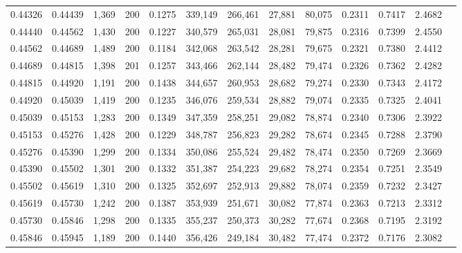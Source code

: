 \begin{tabular}{rrrrrrrrrrrrr}
0.44326 & 0.44439 & 1,369 & 200 &                                     0.1275 & 339,149 & 266,461 &  27,881 &  80,075 & 0.2311 & 0.7417 & 2.4682 \\
0.44440 & 0.44562 & 1,430 & 200 &                                     0.1227 & 340,579 & 265,031 &  28,081 &  79,875 & 0.2316 & 0.7399 & 2.4550 \\
0.44562 & 0.44689 & 1,489 & 200 &                                     0.1184 & 342,068 & 263,542 &  28,281 &  79,675 & 0.2321 & 0.7380 & 2.4412 \\
0.44689 & 0.44815 & 1,398 & 201 &                                     0.1257 & 343,466 & 262,144 &  28,482 &  79,474 & 0.2326 & 0.7362 & 2.4282 \\
0.44815 & 0.44920 & 1,191 & 200 &                                     0.1438 & 344,657 & 260,953 &  28,682 &  79,274 & 0.2330 & 0.7343 & 2.4172 \\
0.44920 & 0.45039 & 1,419 & 200 &                                     0.1235 & 346,076 & 259,534 &  28,882 &  79,074 & 0.2335 & 0.7325 & 2.4041 \\
0.45039 & 0.45153 & 1,283 & 200 &                                     0.1349 & 347,359 & 258,251 &  29,082 &  78,874 & 0.2340 & 0.7306 & 2.3922 \\
0.45153 & 0.45276 & 1,428 & 200 &                                     0.1229 & 348,787 & 256,823 &  29,282 &  78,674 & 0.2345 & 0.7288 & 2.3790 \\
0.45276 & 0.45390 & 1,299 & 200 &                                     0.1334 & 350,086 & 255,524 &  29,482 &  78,474 & 0.2350 & 0.7269 & 2.3669 \\
0.45390 & 0.45502 & 1,301 & 200 &                                     0.1332 & 351,387 & 254,223 &  29,682 &  78,274 & 0.2354 & 0.7251 & 2.3549 \\
0.45502 & 0.45619 & 1,310 & 200 &                                     0.1325 & 352,697 & 252,913 &  29,882 &  78,074 & 0.2359 & 0.7232 & 2.3427 \\
0.45619 & 0.45730 & 1,242 & 200 &                                     0.1387 & 353,939 & 251,671 &  30,082 &  77,874 & 0.2363 & 0.7213 & 2.3312 \\
0.45730 & 0.45846 & 1,298 & 200 &                                     0.1335 & 355,237 & 250,373 &  30,282 &  77,674 & 0.2368 & 0.7195 & 2.3192 \\
0.45846 & 0.45945 & 1,189 & 200 &                                     0.1440 & 356,426 & 249,184 &  30,482 &  77,474 & 0.2372 & 0.7176 & 2.3082 \\

\end{tabular}
